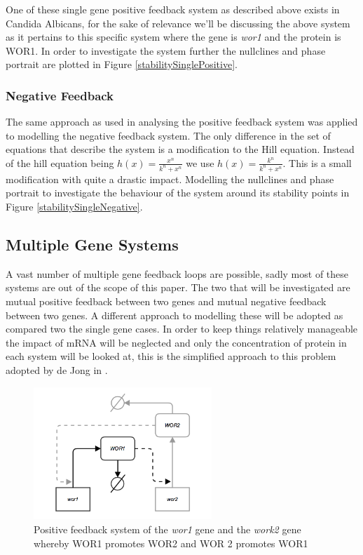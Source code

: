 \documentclass[]{article}
\begin{document}
            One of these single gene positive feedback system as described above exists in Candida Albicans, for the sake of relevance we'll be discussing the above system as it pertains to this specific system where the gene is \textit{wor1} and the protein is WOR1. In order to investigate the system further the nullclines and phase portrait are plotted in Figure \ref{stabilitySinglePositive}. 
           \\
\subsubsection{Negative Feedback} 
            The same approach as used in analysing the positive feedback system was applied to modelling the negative feedback system. The only difference in the set of equations that describe the system is a modification to the Hill equation. Instead of the hill equation being $h(x) = \frac{x^n}{k^n + x^n}$ we use $h(x) = \frac{k^n}{k^n+x^n}$. This is a small modification with quite a drastic impact. Modelling the nullclines and phase portrait to investigate the behaviour of the system around its stability points in Figure \ref{stabilitySingleNegative}. 
\subsection{Multiple Gene Systems}
        A vast number of multiple gene feedback loops are possible, sadly most of these systems are out of the scope of this paper. %
        The two that will be investigated are mutual positive feedback between two genes and mutual negative feedback between two genes. A different approach to modelling these will be adopted as compared two the single gene cases. In order to keep things relatively manageable the impact of mRNA will be neglected and only the concentration of protein in each system will be looked at, this is the simplified approach to this problem adopted by de Jong in \cite{multiGene}. 

        \begin{figure}[h!]
        \centering
        \includegraphics[width=0.6\textwidth]{./figures/doublePositive.png}
        \caption{Positive feedback system of the \textit{wor1} gene and the \textit{work2} gene whereby WOR1 promotes WOR2 and WOR 2 promotes WOR1}
        \label{doublePositive}
        \end{figure}            
    
\end{document}
